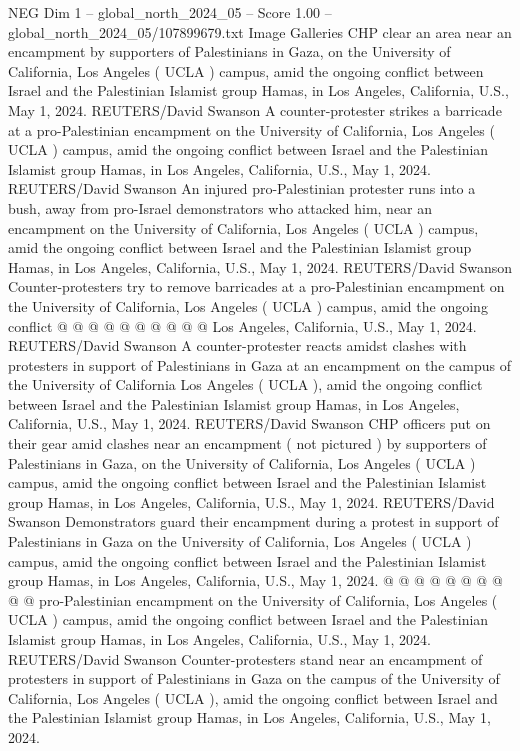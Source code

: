 \begin{textsample}{NEG Dim 1 – global\_north\_2024\_05 – Score 1.00 – global\_north\_2024\_05/107899679.txt}  \label{ex:f1_neg_177}
Image Galleries CHP clear an area near an encampment by supporters of Palestinians in Gaza, on the University of California, Los Angeles ( UCLA ) campus, amid the ongoing conflict between Israel and the Palestinian Islamist group Hamas, in Los Angeles, California, U.S., May 1, 2024.
REUTERS/David Swanson A counter-protester strikes a barricade at a pro-Palestinian encampment on the University of California, Los Angeles ( UCLA ) campus, amid the ongoing conflict between Israel and the Palestinian Islamist group Hamas, in Los Angeles, California, U.S., May 1, 2024.
REUTERS/David Swanson An injured pro-Palestinian protester runs into a bush, away from pro-Israel demonstrators who attacked him, near an encampment on the University of California, Los Angeles ( UCLA ) campus, amid the ongoing conflict between Israel and the Palestinian Islamist group Hamas, in Los Angeles, California, U.S., May 1, 2024.
REUTERS/David Swanson Counter-protesters try to remove barricades at a pro-Palestinian encampment on the University of California, Los Angeles ( UCLA ) campus, amid the ongoing conflict @ @ @ @ @ @ @ @ @ @ Los Angeles, California, U.S., May 1, 2024.
REUTERS/David Swanson A counter-protester reacts amidst clashes with protesters in support of Palestinians in Gaza at an encampment on the campus of the University of California Los Angeles ( UCLA ), amid the ongoing conflict between Israel and the Palestinian Islamist group Hamas, in Los Angeles, California, U.S., May 1, 2024.
REUTERS/David Swanson CHP officers put on their gear amid clashes near an encampment ( not pictured ) by supporters of Palestinians in Gaza, on the University of California, Los Angeles ( UCLA ) campus, amid the ongoing conflict between Israel and the Palestinian Islamist group Hamas, in Los Angeles, California, U.S., May 1, 2024.
REUTERS/David Swanson Demonstrators guard their encampment during a protest in support of Palestinians in Gaza on the University of California, Los Angeles ( UCLA ) campus, amid the ongoing conflict between Israel and the Palestinian Islamist group Hamas, in Los Angeles, California, U.S., May 1, 2024. @ @ @ @ @ @ @ @ @ @ pro-Palestinian encampment on the University of California, Los Angeles ( UCLA ) campus, amid the ongoing conflict between Israel and the Palestinian Islamist group Hamas, in Los Angeles, California, U.S., May 1, 2024.
REUTERS/David Swanson Counter-protesters stand near an encampment of protesters in support of Palestinians in Gaza on the campus of the University of California, Los Angeles ( UCLA ), amid the ongoing conflict between Israel and the Palestinian Islamist group Hamas, in Los Angeles, California, U.S., May 1, 2024.

\end{textsample}
